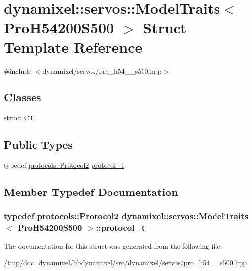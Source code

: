 \hypertarget{structdynamixel_1_1servos_1_1_model_traits_3_01_pro_h54200_s500_01_4}{}\section{dynamixel\+:\+:servos\+:\+:Model\+Traits$<$ Pro\+H54200\+S500 $>$ Struct Template Reference}
\label{structdynamixel_1_1servos_1_1_model_traits_3_01_pro_h54200_s500_01_4}


{\ttfamily \#include $<$dynamixel/servos/pro\+\_\+h54\+\_\+\_\+s500.\+hpp$>$}

\subsection*{Classes}
\begin{DoxyCompactItemize}
\item 
struct \hyperlink{structdynamixel_1_1servos_1_1_model_traits_3_01_pro_h54200_s500_01_4_1_1_c_t}{CT}
\end{DoxyCompactItemize}
\subsection*{Public Types}
\begin{DoxyCompactItemize}
\item 
typedef \hyperlink{classdynamixel_1_1protocols_1_1_protocol2}{protocols\+::\+Protocol2} \hyperlink{structdynamixel_1_1servos_1_1_model_traits_3_01_pro_h54200_s500_01_4_af47623764c69c322b468d6b418308540}{protocol\+\_\+t}
\end{DoxyCompactItemize}


\subsection{Member Typedef Documentation}
\subsubsection[{\texorpdfstring{protocol\+\_\+t}{protocol_t}}]{\setlength{\rightskip}{0pt plus 5cm}typedef {\bf protocols\+::\+Protocol2} {\bf dynamixel\+::servos\+::\+Model\+Traits}$<$ {\bf Pro\+H54200\+S500} $>$\+::{\bf protocol\+\_\+t}}\hypertarget{structdynamixel_1_1servos_1_1_model_traits_3_01_pro_h54200_s500_01_4_af47623764c69c322b468d6b418308540}{}\label{structdynamixel_1_1servos_1_1_model_traits_3_01_pro_h54200_s500_01_4_af47623764c69c322b468d6b418308540}


The documentation for this struct was generated from the following file\+:\begin{DoxyCompactItemize}
\item 
/tmp/doc\+\_\+dynamixel/libdynamixel/src/dynamixel/servos/\hyperlink{pro__h54__200__s500_8hpp}{pro\+\_\+h54\+\_\+\_\+s500.\+hpp}\end{DoxyCompactItemize}
